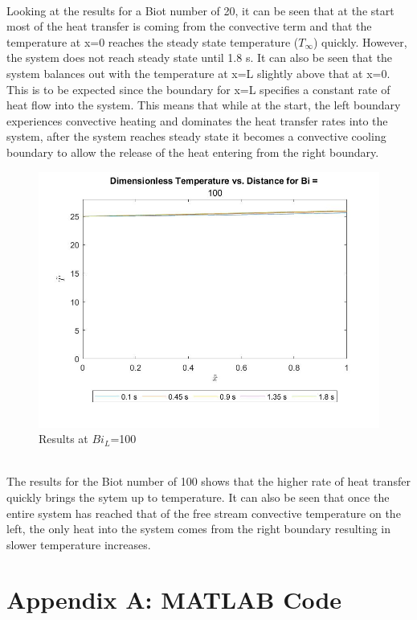 \documentclass[conf]{new-aiaa}
\begin{document}
\\
Looking at the results for a Biot number of 20, it can be seen that at the start most of the heat transfer is coming from the convective term and that the temperature at x=0 reaches the steady state temperature ($T_\infty$) quickly. However, the system does not reach steady state until 1.8 s. It can also be seen that the system balances out with the temperature at x=L slightly above that at x=0. This is to be expected since the boundary for x=L specifies a constant rate of heat flow into the system. This means that while at the start, the left boundary experiences convective heating and dominates the heat transfer rates into the system, after the system reaches steady state it becomes a convective cooling boundary to allow the release of the heat entering from the right boundary.
\begin{figure}[hbt!]
\centering
\includegraphics[width=.5\textwidth]{Bi100.jpg}
\caption{Results at $Bi_L$=100}
\end{figure}
\\
The results for the Biot number of 100 shows that the higher rate of heat transfer quickly brings the sytem up to temperature. It can also be seen that once the entire system has reached that of the free stream convective temperature on the left, the only heat into the system comes from the right boundary resulting in slower temperature increases.

\clearpage
\section*{Appendix A: MATLAB Code}
\end{document}

